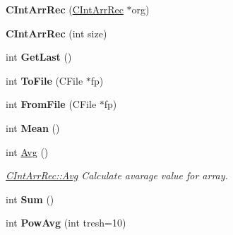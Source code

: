 \begin{DoxyCompactItemize}
\item 
\hypertarget{class_c_int_arr_rec_a406b9d1fa087944137401811f5096852}{{\bfseries C\-Int\-Arr\-Rec} (\hyperlink{class_c_int_arr_rec}{C\-Int\-Arr\-Rec} $\ast$org)}\label{class_c_int_arr_rec_a406b9d1fa087944137401811f5096852}

\item 
\hypertarget{class_c_int_arr_rec_a279b86578ee42ce4f0c69dd234536d48}{{\bfseries C\-Int\-Arr\-Rec} (int size)}\label{class_c_int_arr_rec_a279b86578ee42ce4f0c69dd234536d48}

\item 
\hypertarget{class_c_int_arr_rec_a8cb7128d682a0b1146c654d4793ed90a}{int {\bfseries Get\-Last} ()}\label{class_c_int_arr_rec_a8cb7128d682a0b1146c654d4793ed90a}

\item 
\hypertarget{class_c_int_arr_rec_a4cb2518b1cfb9ff926a8f60a71d6e02e}{int {\bfseries To\-File} (C\-File $\ast$fp)}\label{class_c_int_arr_rec_a4cb2518b1cfb9ff926a8f60a71d6e02e}

\item 
\hypertarget{class_c_int_arr_rec_af18abbc54d29487ad1d52200dc6da424}{int {\bfseries From\-File} (C\-File $\ast$fp)}\label{class_c_int_arr_rec_af18abbc54d29487ad1d52200dc6da424}

\item 
\hypertarget{class_c_int_arr_rec_ae9763809548d78d5d17f5ea0a9d327da}{int {\bfseries Mean} ()}\label{class_c_int_arr_rec_ae9763809548d78d5d17f5ea0a9d327da}

\item 
int \hyperlink{class_c_int_arr_rec_a3f6b23ec8cfd4ef0df730ca1ec5a2fd3}{Avg} ()
\begin{DoxyCompactList}\small\item\em \hyperlink{class_c_int_arr_rec_a3f6b23ec8cfd4ef0df730ca1ec5a2fd3}{C\-Int\-Arr\-Rec\-::\-Avg} Calculate avarage value for array. \end{DoxyCompactList}\item 
\hypertarget{class_c_int_arr_rec_aeec7beda9ecc945ad7c9c4df4fec3656}{int {\bfseries Sum} ()}\label{class_c_int_arr_rec_aeec7beda9ecc945ad7c9c4df4fec3656}

\item 
\hypertarget{class_c_int_arr_rec_a6d3c91037865b340f38677feb8230b90}{int {\bfseries Pow\-Avg} (int tresh=10)}\label{class_c_int_arr_rec_a6d3c91037865b340f38677feb8230b90}


\end{DoxyCompactItemize}
